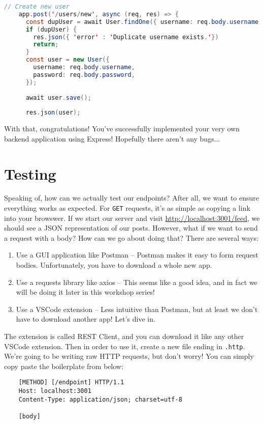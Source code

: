 \begin{lstlisting}[language=Java]
    // Create new user 
    app.post('/users/new', async (req, res) => {
      const dupUser = await User.findOne({ username: req.body.username });
      if (dupUser) {
        res.json({ 'error' : 'Duplicate username exists.'})
        return;
      }
      const user = new User({
        username: req.body.username,
        password: req.body.password,
      });
    
      await user.save();
    
      res.json(user);
\end{lstlisting}

With that, congratulations! You've successfully implemented your very own backend application using Express! Hopefully there aren't any bugs...

\section{Testing}

Speaking of, how can we actually test our endpoints? After all, we want to ensure everything works as expected. For \texttt{GET} requests, it's as simple as copying a link into your browswer. If we start our server and visit \url{http://localhost:3001/feed}, we should see a JSON representation of our posts. However, what if we want to send a request with a body? How can we go about doing that? There are several ways:

\begin{enumerate}
    \item Use a GUI application like Postman -- Postman makes it easy to form request bodies. Unfortunately, you have to download a whole new app.
    \item Use a requests library like axios -- This seems like a good idea, and in fact we will be doing it later in this workshop series!
    \item Use a VSCode extension -- Less intuitive than Postman, but at least we don't have to download another app! Let's dive in.
\end{enumerate}

The extension is called REST Client, and you can download it like any other VSCode extension. Then in order to use it, create a new file ending in \texttt{.http}. We're going to be writing raw HTTP requests, but don't worry! You can simply copy paste the boilerplate from below:

\begin{verbatim}
    [METHOD] [/endpoint] HTTP/1.1
    Host: localhost:3001
    Content-Type: application/json; charset=utf-8

    [body]
\end{verbatim}


